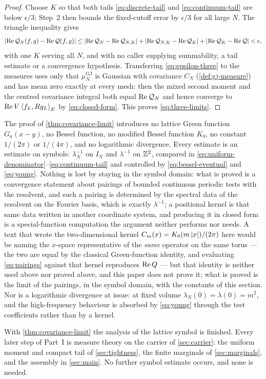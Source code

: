 \begin{proof}
Choose $K$ so that both tails \eqref{eq:discrete-tail} and
\eqref{eq:continuum-tail} are below $\epsilon/3$; Step~2 then bounds the
fixed-cutoff error by $\epsilon/3$ for all large $N$. The triangle inequality
gives
\begin{equation}\label{eq:epsilon-three}
  \left| \operatorname{Re}\mathcal Q_N(f,g)-\operatorname{Re}\mathcal Q(f,g) \right|
  \le\left| \operatorname{Re}\mathcal Q_N-\operatorname{Re}\mathcal Q_{N,K} \right|
   +\left| \operatorname{Re}\mathcal Q_{N,K}-\operatorname{Re}\mathcal Q_K \right|
   +\left| \operatorname{Re}\mathcal Q_K-\operatorname{Re}\mathcal Q \right|
  <\epsilon,
\end{equation}
with one $K$ serving all $N$, and with no caller supplying summability, a tail
estimate or a convergence hypothesis. Transferring \eqref{eq:epsilon-three} to
the measures uses only that $\mu^{\mathrm{GJ}}_N$ is Gaussian with covariance
$C_N$ (\cref{def:gj-measure}) and has mean zero exactly at every mesh: then the
mixed second moment and the centred covariance integral both equal
$\operatorname{Re}\mathcal Q_N$ and hence converge to $\operatorname{Re} V\left\langle f_L, Rg_L \right\rangle_E$ by
\eqref{eq:closed-form}. This proves \eqref{eq:three-limits}.
\end{proof}

\begin{remark}\label{rem:no-bessel}
The proof of \cref{thm:covariance-limit} introduces no lattice Green function
$G_a(x-y)$, no Bessel function, no modified Bessel function $K_0$, no constant
$1/(2\pi)$ or $1/(4\pi)$, and no logarithmic divergence. Every estimate is an
estimate on symbols: $\lambda_N^{-1}$ on $I_N$ and $\lambda^{-1}$ on $\mathbb{Z}^2$,
compared in \eqref{eq:uniform-denominator}--\eqref{eq:continuum-tail} and
controlled by \eqref{eq:bessel-eventual} and \eqref{eq:young}. Nothing is lost
by staying in the symbol domain: what is proved is a convergence statement
about pairings of bounded continuous periodic tests with the resolvent, and such
a pairing is determined by the spectral data of the resolvent on the Fourier
basis, which is exactly $\lambda^{-1}$; a positional kernel is that same data
written in another coordinate system, and producing it in closed form is a
special-function computation the argument neither performs nor needs. A text
that wrote the two-dimensional kernel $C_m(x)=K_0(m\left| x \right|)/(2\pi)$ here would be
naming the $x$-space representative of the \emph{same} operator on the same torus ---
the two are equal by the classical Green-function identity, and evaluating
\eqref{eq:pairings} against that kernel reproduces $\operatorname{Re} Q$ --- but that
identity is neither used above nor proved above, and this paper does not prove
it; what is proved is the limit of the pairings, in the symbol domain, with the
constants of this section.
Nor is a logarithmic divergence at issue: at fixed volume
$\lambda_N(0)=\lambda(0)=m^2$, and the high-frequency behaviour is absorbed by
\eqref{eq:young} through the test coefficients rather than by a kernel.
\end{remark}

With \cref{thm:covariance-limit} the analysis of the lattice symbol is finished.
Every later step of Part~I is measure theory on the carrier of
\cref{sec:carrier}: the uniform moment and compact tail of
\cref{sec:tightness}, the finite marginals of \cref{sec:marginals}, and the
assembly in \cref{sec:main}. No further symbol estimate occurs, and none is
needed.
